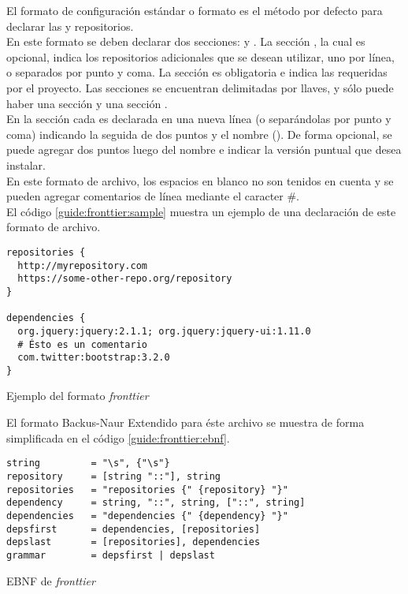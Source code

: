 El formato de configuración estándar o formato \fronttier es el método por 
defecto para declarar las \dependencies y repositorios.\\
En este formato se deben declarar dos secciones:  y 
. La sección , la cual es opcional, 
indica los repositorios adicionales que se desean utilizar, uno por línea, o 
separados por punto y coma. La sección  es obligatoria e 
indica las \dependencies requeridas por el proyecto. Las secciones se 
encuentran 
delimitadas por llaves, y sólo puede haber una sección 
 y una sección .\\
En la sección  cada \dependency es declarada en una nueva 
línea (o separándolas por punto y coma) indicando la  seguida de 
dos puntos y el nombre (). De forma opcional, se puede agregar dos 
puntos luego del nombre e indicar la versión puntual que desea instalar.\\
En este formato de archivo, los espacios en blanco no son tenidos en cuenta y 
se pueden agregar comentarios de línea mediante el caracter \#.\\
El código \ref{guide:fronttier:sample} muestra un ejemplo de una declaración de 
este formato de archivo.

\begin{listing}[ht]
	\begin{verbatim}
repositories {
  http://myrepository.com
  https://some-other-repo.org/repository
}

dependencies {
  org.jquery:jquery:2.1.1; org.jquery:jquery-ui:1.11.0
  # Ésto es un comentario
  com.twitter:bootstrap:3.2.0
}
	\end{verbatim}
	\caption{Ejemplo del formato \emph{fronttier}}
	\label{guide:fronttier:sample}
\end{listing}

El formato Backus-Naur Extendido para éste archivo se muestra de forma 
simplificada en el código \ref{guide:fronttier:ebnf}.

\begin{listing}[ht]
	\begin{verbatim}
string         = "\s", {"\s"}
repository     = [string "::"], string
repositories   = "repositories {" {repository} "}"
dependency     = string, "::", string, ["::", string]
dependencies   = "dependencies {" {dependency} "}"
depsfirst      = dependencies, [repositories]
depslast       = [repositories], dependencies
grammar        = depsfirst | depslast
	\end{verbatim}
	\caption{EBNF de \emph{fronttier}}
	\label{guide:fronttier:ebnf}
\end{listing}

